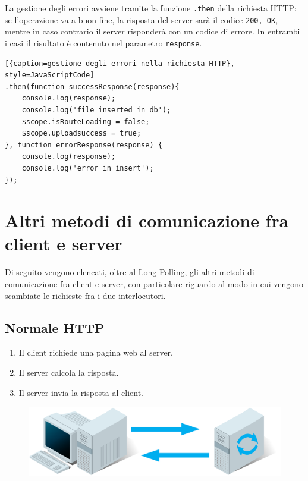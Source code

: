 La gestione degli errori avviene tramite la funzione \texttt{.then} della richiesta HTTP: se l'operazione va a buon fine, la risposta del server sarà il codice \texttt{200, OK}, mentre in caso contrario il server risponderà con un codice di errore. In entrambi i casi il risultato è contenuto nel parametro \texttt{response}.

\begin{lstlisting}[{caption=gestione degli errori nella richiesta HTTP}, style=JavaScriptCode]
.then(function successResponse(response){
	console.log(response);
	console.log('file inserted in db');
	$scope.isRouteLoading = false;
	$scope.uploadsuccess = true;
}, function errorResponse(response) {
	console.log(response);
	console.log('error in insert');
});
\end{lstlisting}

\section{Altri metodi di comunicazione fra client e server}
Di seguito vengono elencati, oltre al Long Polling, gli altri metodi di comunicazione fra client e server, con particolare riguardo al modo in cui vengono scambiate le richieste fra i due interlocutori.

\subsection{Normale HTTP}
\begin{enumerate}
	\item Il client richiede una pagina web al server.
	\item Il server calcola la risposta.
	\item Il server invia la risposta al client.
\end{enumerate}
\begin{figure}[h]
	\centering
	\includegraphics[scale=0.4]{Immagini/regular_http.png}
\end{figure}
